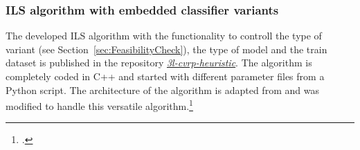 \subsubsection{ILS algorithm with embedded classifier variants}
The developed \gls{ILS} algorithm with the functionality to controll the type of variant (see Section~\ref{sec:FeasibilityCheck}), the type
of model and the train dataset is published in the repository \href{https://github.com/MxHbm/3l-cvrp-heuristic}{\textit{3l-cvrp-heuristic}}.
The algorithm is completely coded in C++ and started with different parameter files from a Python script. The architecture of the algorithm is
adapted from \cite{tamke_repository_2024} and was modified to handle this versatile algorithm.\footcite[cf.][]{tamke_repository_2024}